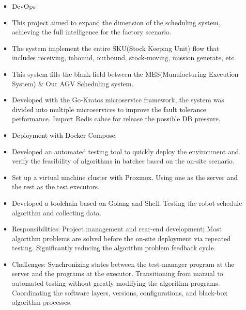 \documentclass[a4paper,10pt]{resume}
\begin{document}
\begin{itemize}[parsep=0.5ex]
  \item DevOps
  \item This project aimed to expand the dimension of the scheduling system, achieving the full intelligence for the factory scenario.
  \item The system implement the entire SKU(Stock Keeping Unit) flow that includes receiving, inbound, outbound, stock-moving, mission generate, etc.
  \item This system fills the blank field between the MES(Munufacturing Execution System) & Our AGV Scheduling system.
  \item Developed with the Go-Kratos microservice framework, the system was divided into multiple microservices to improve the fault tolerance performance. Import Redis cahce for release the possible DB pressure.
  \item Deployment with Docker Compose.
\end{itemize}


\begin{itemize}[parsep=0.5ex]
  \item Developed an automated testing tool to quickly deploy the environment and verify the feasibility of algorithms in batches based on the on-site scenario.
  \item Set up a virtual machine cluster with Proxmox. Using one as the server and the rest as the test executors.
  \item Developed a toolchain based on Golang and Shell. Testing the robot schedule algorithm and collecting data.
  \item Responsibilities: Project management and rear-end development; Most algorithm problems are solved before the on-site deployment via repeated testing. Significantly reducing the algorithm problem feedback cycle.
  \item Challenges: Synchronizing states between the test-manager program at the server and the programs at the executor. Transitioning from manual to automated testing without greatly modifying the algorithm programs. Coordinating the software layers, versions, configurations, and black-box algorithm processes.
\end{itemize}
\end{document}
